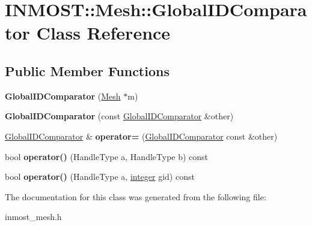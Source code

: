 \hypertarget{classINMOST_1_1Mesh_1_1GlobalIDComparator}{\section{I\-N\-M\-O\-S\-T\-:\-:Mesh\-:\-:Global\-I\-D\-Comparator Class Reference}
\label{classINMOST_1_1Mesh_1_1GlobalIDComparator}
}
\subsection*{Public Member Functions}
\begin{DoxyCompactItemize}
\item 
\hypertarget{classINMOST_1_1Mesh_1_1GlobalIDComparator_a554e10d8c822c38589546e5272626fbb}{{\bfseries Global\-I\-D\-Comparator} (\hyperlink{classINMOST_1_1Mesh}{Mesh} $\ast$m)}\label{classINMOST_1_1Mesh_1_1GlobalIDComparator_a554e10d8c822c38589546e5272626fbb}

\item 
\hypertarget{classINMOST_1_1Mesh_1_1GlobalIDComparator_ae23c9b0bcef351c6160b302883e16bd7}{{\bfseries Global\-I\-D\-Comparator} (const \hyperlink{classINMOST_1_1Mesh_1_1GlobalIDComparator}{Global\-I\-D\-Comparator} \&other)}\label{classINMOST_1_1Mesh_1_1GlobalIDComparator_ae23c9b0bcef351c6160b302883e16bd7}

\item 
\hypertarget{classINMOST_1_1Mesh_1_1GlobalIDComparator_a01646d1493a93ed524f8f7931f5ff820}{\hyperlink{classINMOST_1_1Mesh_1_1GlobalIDComparator}{Global\-I\-D\-Comparator} \& {\bfseries operator=} (\hyperlink{classINMOST_1_1Mesh_1_1GlobalIDComparator}{Global\-I\-D\-Comparator} const \&other)}\label{classINMOST_1_1Mesh_1_1GlobalIDComparator_a01646d1493a93ed524f8f7931f5ff820}

\item 
\hypertarget{classINMOST_1_1Mesh_1_1GlobalIDComparator_ac382eb1939cb5099bafb7fca4b081e3c}{bool {\bfseries operator()} (Handle\-Type a, Handle\-Type b) const }\label{classINMOST_1_1Mesh_1_1GlobalIDComparator_ac382eb1939cb5099bafb7fca4b081e3c}

\item 
\hypertarget{classINMOST_1_1Mesh_1_1GlobalIDComparator_a43c30f59baa22cd86ad4ac31a9bbeef6}{bool {\bfseries operator()} (Handle\-Type a, \hyperlink{classINMOST_1_1Storage_aec96942bc647417a801e2895b45964d2}{integer} gid) const }\label{classINMOST_1_1Mesh_1_1GlobalIDComparator_a43c30f59baa22cd86ad4ac31a9bbeef6}

\end{DoxyCompactItemize}


The documentation for this class was generated from the following file\-:\begin{DoxyCompactItemize}
\item 
inmost\-\_\-mesh.\-h\end{DoxyCompactItemize}
